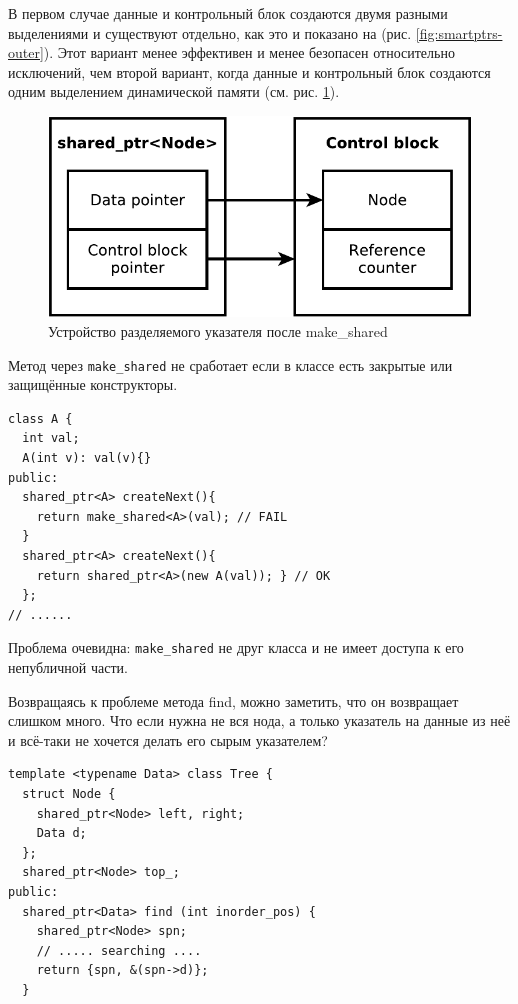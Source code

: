 \documentclass[a4paper,12pt,oneside]{article}
\begin{document}
В первом случае данные и контрольный блок создаются двумя разными выделениями и существуют отдельно, как это и показано на (рис. \ref{fig:smartptrs-outer}). Этот вариант менее эффективен и менее безопасен относительно исключений, чем второй вариант, когда данные и контрольный блок создаются одним выделением динамической памяти (см. рис. \ref{fig:smartptrs-inner}).

\begin{figure}[ht]
\centering
\includegraphics[width=1.0\textwidth]{illustrations/smartptrs-inner-crop.pdf}
\caption{Устройство разделяемого указателя после make\_shared}
\label{fig:smartptrs-inner}
\end{figure}

Метод через \lstinline!make_shared! не сработает если в классе есть закрытые или защищённые конструкторы.

\begin{lstlisting}
class A {
  int val;
  A(int v): val(v){}
public:
  shared_ptr<A> createNext(){ 
    return make_shared<A>(val); // FAIL 
  }
  shared_ptr<A> createNext(){ 
    return shared_ptr<A>(new A(val)); } // OK
  };
// ......
\end{lstlisting}

Проблема очевидна: \lstinline!make_shared! не друг класса и не имеет доступа к его непубличной части.

Возвращаясь к проблеме метода find, можно заметить, что он возвращает слишком много. Что если нужна не вся нода, а только указатель на данные из неё и всё-таки не хочется делать его сырым указателем?

\begin{lstlisting}
template <typename Data> class Tree {
  struct Node {
    shared_ptr<Node> left, right;
    Data d;
  };
  shared_ptr<Node> top_;
public: 
  shared_ptr<Data> find (int inorder_pos) {
    shared_ptr<Node> spn;
    // ..... searching ....
    return {spn, &(spn->d)};
  }
\end{lstlisting}
\end{document}
